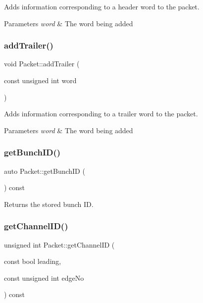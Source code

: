 Adds information corresponding to a header word to the packet. 


\begin{DoxyParams}{Parameters}
{\em word} & The word being added \\
\hline
\end{DoxyParams}
\mbox{\label{class_packet_a13eccb2f6b6d527549839579920e5105}} 
\subsubsection{\texorpdfstring{add\+Trailer()}{addTrailer()}}
{\footnotesize\ttfamily void Packet\+::add\+Trailer (\begin{DoxyParamCaption}\item[{const unsigned int}]{word }\end{DoxyParamCaption})}



Adds information corresponding to a trailer word to the packet. 


\begin{DoxyParams}{Parameters}
{\em word} & The word being added \\
\hline
\end{DoxyParams}
\mbox{\label{class_packet_ad41753459fdff74b59c2f2e6d46b8673}} 
\subsubsection{\texorpdfstring{get\+Bunch\+I\+D()}{getBunchID()}}
{\footnotesize\ttfamily auto Packet\+::get\+Bunch\+ID (\begin{DoxyParamCaption}{ }\end{DoxyParamCaption}) const\hspace{0.3cm}{\ttfamily [inline]}}



Returns the stored bunch ID. 

\mbox{\label{class_packet_a8a767973ff4b30b417716bbb071ccf33}} 
\subsubsection{\texorpdfstring{get\+Channel\+I\+D()}{getChannelID()}}
{\footnotesize\ttfamily unsigned int Packet\+::get\+Channel\+ID (\begin{DoxyParamCaption}\item[{const bool}]{leading,  }\item[{const unsigned int}]{edge\+No }\end{DoxyParamCaption}) const}




